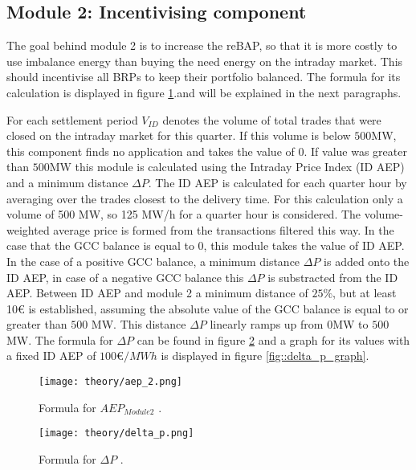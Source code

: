 \documentclass[class=scrbook, crop=false]{standalone}
\begin{document}
\subsection{Module 2: Incentivising component}

The goal behind module 2 is to increase the reBAP, so that it is more costly to use imbalance energy than buying the need energy on the intraday market. This should incentivise all BRPs to keep their portfolio balanced. 
The formula for its calculation is displayed in figure \ref{fig::aep2}.and will be explained in the next paragraphs.

For each settlement period $V_{ID}$ denotes the volume of total trades that were closed on the intraday market for this quarter. If this volume is below $500$MW, this component finds no application and takes the value of 0. If value was greater than $500$MW this module is calculated using the Intraday Price Index (ID AEP) and a minimum distance $\Delta P$. 
The ID AEP is calculated for each quarter hour by averaging over the trades closest to the delivery time. For this calculation only a volume of 500 MW, so 125 MW/h for a quarter hour is considered.  
The volume-weighted average price is formed from the transactions filtered this way. 
In the case that the GCC balance is equal to 0, this module takes the value of ID AEP.  In the case of a positive GCC balance, a minimum distance $\Delta P$ is added onto the ID AEP, in case of a negative GCC balance this $\Delta P$ is substracted from the ID AEP. Between ID AEP and module 2 a minimum distance of $25\%$, but at least 10€ is established, assuming the absolute value of the GCC balance is equal to or greater than $500$ MW. This distance $\Delta P$ linearly ramps up from $0$MW to $500$MW. The formula for $\Delta P$ can be found in figure \ref{fig::delta_p} and a graph for its values with a fixed ID AEP of $100€/MWh$ is displayed in figure \ref{fig::delta_p_graph}.

 \begin{figure}[ht]
            \centering
            \texttt{[image: theory/aep\_2.png]}
             \caption[Formula for $AEP_{Module 2}$]{Formula for $AEP_{Module 2}$ \cite{reBAP}.}
            \label{fig::aep2}
 \end{figure}

 \begin{figure}[ht]
            \centering
            \texttt{[image: theory/delta\_p.png]}
             \caption[Formula for$ \Delta P$]{Formula for $\Delta P$ \cite{reBAP}.}
            \label{fig::delta_p}
 \end{figure}
 
\end{document}
